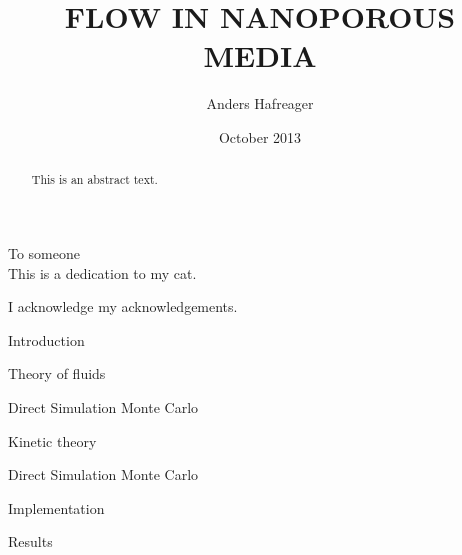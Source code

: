 \documentclass[twoside,english, a4paper, 12pt]{uiofysmaster}
\author{Anders Hafreager}
\title{\uppercase{Flow in nanoporous media}}
\date{October 2013}
\begin{document}
\maketitle
\clearpage

\begin{abstract}
This is an abstract text.
\end{abstract}
\begin{dedication}
  To someone
  \\\vspace{12pt}
  This is a dedication to my cat.
\end{dedication}
\begin{acknowledgements}
  I acknowledge my acknowledgements.
\end{acknowledgements}

\tableofcontents
\clearpage
\listoffigures
\clearpage
\listoftables

\begin{chapter}{Introduction}
  
\end{chapter}

\begin{chapter}{Theory of fluids}
  
  
  
\end{chapter}

\begin{part}{Direct Simulation Monte Carlo}
\begin{chapter}{Kinetic theory}
  \label{chap:kinetic_theory}
  
  
\end{chapter}

\begin{chapter}{Direct Simulation Monte Carlo}
  \label{chap:dsmc}
  
  
  
  
  
  
  
  
\end{chapter}
\begin{chapter}{Implementation}
  
  
  
  
\end{chapter}
\begin{chapter}{Results}
  \label{chap:dsmc_results}
  
  
\end{chapter}
\end{part}
\end{document}
